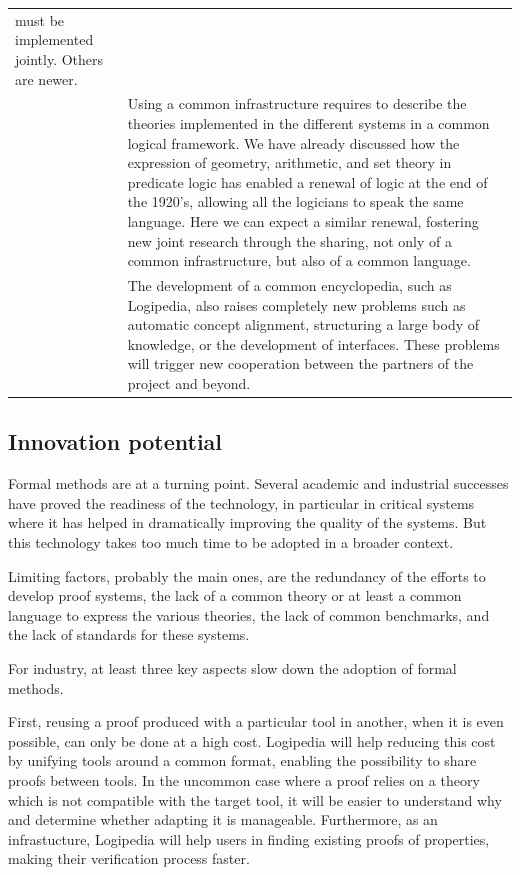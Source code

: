 \begin{longtable}{|p{}|p{}|}
must be implemented jointly. Others are newer.\\
&
\hspace{0.4cm}
Using a common infrastructure requires
to describe the theories implemented in the different systems in a
common logical framework. We have already discussed how the expression
of geometry, arithmetic, and set theory in predicate logic has
enabled a renewal of logic at the end of the 1920's, allowing all
the logicians to speak the same language. Here we can expect a similar
renewal, fostering new joint research through the sharing, not
only of a common infrastructure, but also of a common language.\\
&
\hspace{0.4cm}
The development of a common encyclopedia, such as Logipedia, also
raises completely new problems such as automatic concept alignment,
structuring a large body of knowledge, or the development of
interfaces. These problems will trigger new cooperation between the
partners of the project and beyond.\\
\hline
\end{longtable}

\subsection*{Innovation potential}

Formal methods are at a turning point. Several academic and
industrial successes have proved the readiness of the technology,
in particular in critical systems where it has helped in
dramatically improving the quality of the systems. But this
technology takes too much time to be adopted in a broader context.

Limiting factors, probably the main ones, are the redundancy of the
efforts to develop proof systems, the lack of a common theory or at
least a common language to express the various theories, the lack of
common benchmarks, and the lack of standards for these systems.

For industry, at least three key aspects slow down the adoption of
formal methods.

First, reusing a proof produced with a particular tool in another, 
when it is even possible, can only be done at a high cost.
Logipedia will help reducing this cost by unifying tools
around a common format, enabling the possibility to share proofs
between tools. In the uncommon case where a proof relies on a theory
which is not compatible with the target tool, it will be easier to
understand why and determine whether adapting it is manageable.
Furthermore, as an infrastucture, Logipedia will help users
in finding existing proofs of properties, making their verification
process faster.

